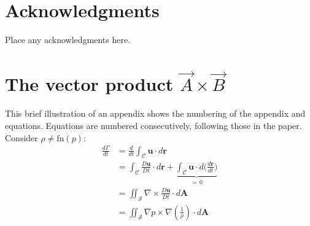 \documentclass[colorlinks,upint,subscriptcorrection,varvw,hyphenate,balance,greek,russian,vietnamese,german]{asmeconf} %
\begin{document}

\section*{Acknowledgments}
Place any acknowledgments here.



\nocite{*}%



\appendix


\section[The Vector Product A\times B]{The vector product $\vec{A}\times\vec{B}$}\label{appendix:a}

This brief illustration of an appendix shows the numbering of the appendix and equations. Equations are numbered
consecutively, following those in the paper. Consider $\rho \neq \textrm{fn}(p)$:
\begin{align}
\frac{d\Gamma}{dt} &{}= \frac{d}{dt} \int_{\mathcal{C}} \mathbf{u} \cdot d\mathbf{r}\\
				   &{}= \int_{\mathcal{C}} \frac{D\mathbf{u}}{Dt} \cdot d\mathbf{r} + \underbrace{\int_{\mathcal{C}} \mathbf{u}\cdot d\biggl( \frac{d\mathbf{r}}{dt}\biggr)}_{=\, 0} \\[-2pt]
                   &{}= \iint_{\mathcal{S}} \nabla \times \frac{D\mathbf{u}}{Dt}  \cdot d\mathbf{A}\\
                   &{}= \iint_{\mathcal{S}}  \nabla p \times \nabla \left( \frac{1}{\rho}\right) \cdot d\mathbf{A}
\end{align}
\end{document}
